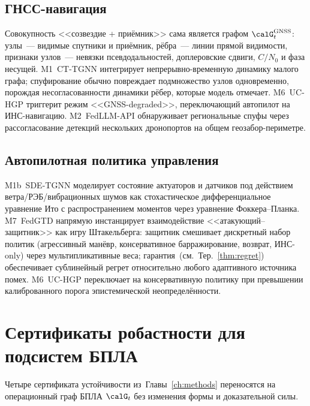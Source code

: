 \subsection{ГНСС-навигация}
\label{sec:uav_gnss}

Совокупность <<созвездие + приёмник>> сама является графом
$\calG_t^{\text{GNSS}}$: узлы~--- видимые спутники и приёмник, рёбра~---
линии прямой видимости, признаки узлов~--- невязки псевдодальностей,
доплеровские сдвиги, $C/N_0$ и фаза несущей. \textsf{M1~CT-TGNN}
интегрирует непрерывно-временную динамику малого графа; спуфирование
обычно повреждает подмножество узлов одновременно, порождая
несогласованности динамики рёбер, которые модель отмечает.
\textsf{M6~UC-HGP} триггерит режим <<GNSS-degraded>>, переключающий
автопилот на ИНС-навигацию. \textsf{M2~FedLLM-API} обнаруживает
региональные спуфы через рассогласование детекций нескольких
дронопортов на общем геозабор-периметре.

\subsection{Автопилотная политика управления}
\label{sec:uav_autopilot}

\textsf{M1b~SDE-TGNN} моделирует состояние актуаторов и датчиков под
действием ветра/РЭБ/вибрационных шумов как стохастическое
дифференциальное уравнение Ито с распространением моментов через
уравнение Фоккера--Планка. \textsf{M7~FedGTD} напрямую инстанцирует
взаимодействие <<атакующий--защитник>> как игру Штакельберга:
защитник смешивает дискретный набор политик (агрессивный манёвр,
консервативное барражирование, возврат, ИНС-only) через
мультипликативные веса; гарантия~(см.\ Тер.~\ref{thm:regret}) обеспечивает
сублинейный регрет относительно любого адаптивного источника помех.
\textsf{M6~UC-HGP} переключает на консервативную политику при
превышении калиброванного порога эпистемической неопределённости.


\section{Сертификаты робастности для подсистем БПЛА}
\label{sec:uav_certs}

Четыре сертификата устойчивости из~Главы~\ref{ch:methods}
переносятся на операционный граф БПЛА $\calG_t$ без изменения формы и
доказательной силы.

